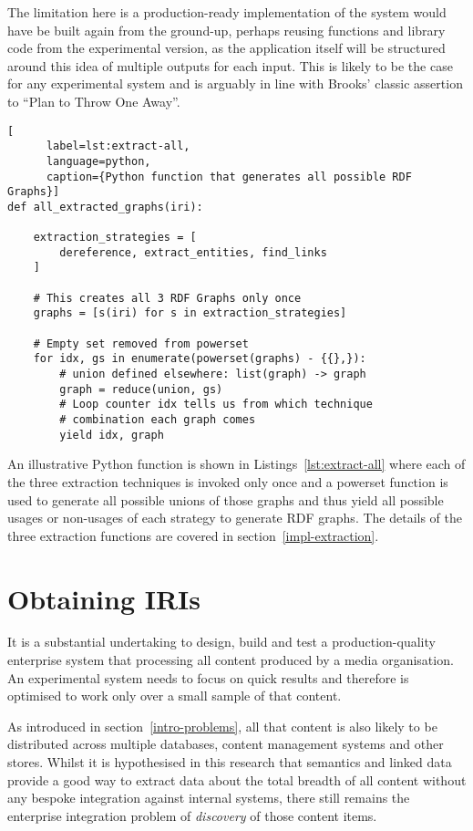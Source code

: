The limitation here is a production-ready implementation of the
system would have be built again from the ground-up, perhaps reusing
functions and library code from the experimental version, as the
application itself will be structured around this idea of multiple
outputs for each input. This is likely to be the case for any
experimental system and is arguably in line with Brooks' classic
assertion to ``Plan to Throw One Away''\cite{brooks1995mythical}.

\begin{centering}
  \begin{lstlisting}[
      label=lst:extract-all,
      language=python,
      caption={Python function that generates all possible RDF Graphs}]
def all_extracted_graphs(iri):
    
    extraction_strategies = [
        dereference, extract_entities, find_links
    ]

    # This creates all 3 RDF Graphs only once
    graphs = [s(iri) for s in extraction_strategies]

    # Empty set removed from powerset
    for idx, gs in enumerate(powerset(graphs) - {{},}):
        # union defined elsewhere: list(graph) -> graph
        graph = reduce(union, gs)
        # Loop counter idx tells us from which technique
        # combination each graph comes
        yield idx, graph
  \end{lstlisting}
\end{centering}

An illustrative Python function is shown in
Listings~\ref{lst:extract-all} where each of the three extraction
techniques is invoked only once and a powerset function is used to
generate all possible unions of those graphs and thus yield all
possible usages or non-usages of each strategy to generate RDF
graphs. The details of the three extraction functions are covered in
section~\ref{impl-extraction}.

\section{Obtaining IRIs}

It is a substantial undertaking to design, build and test a
production-quality enterprise system that processing all content
produced by a media organisation. An experimental system needs to
focus on quick results and therefore is optimised to work only over
a small sample of that content.

As introduced in section~\ref{intro-problems}, all that content is
also likely to be distributed across multiple databases, content
management systems and other stores. Whilst it is hypothesised in
this research that semantics and linked data provide a good way to
extract data about the total breadth of all content without any
bespoke integration against internal systems, there still remains
the enterprise integration problem of \emph{discovery} of those
content items.

